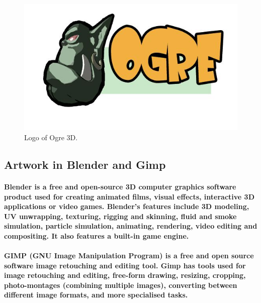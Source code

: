 \documentclass[a4paper,10pt]{article}
\newcommand{\p}[1]{\paragraph{\indent\textnormal{#1}}}
\begin{document}
	\begin{figure}[hbt]
	    \begin{center}
		\includegraphics[scale=.4]{ogrelogo.jpg}
	    \end{center}
	    \caption{Logo of Ogre 3D.}
	\end{figure}

  \subsection{Artwork in Blender and Gimp}

    \p{\textbf{Blender} is a free and open-source 3D computer graphics software product used for creating animated films, visual effects, interactive 3D applications or video games. Blender's features include 3D modeling, UV unwrapping, texturing, rigging and skinning, fluid and smoke simulation, particle simulation, animating, rendering, video editing and compositing. It also features a built-in game engine.}

    \p{\textbf{GIMP} (GNU Image Manipulation Program) is a free and open source software image retouching and editing tool. Gimp has tools used for image retouching and editing, free-form drawing, resizing, cropping, photo-montages (combining multiple images), converting between different image formats, and more specialised tasks. }
\end{document}
